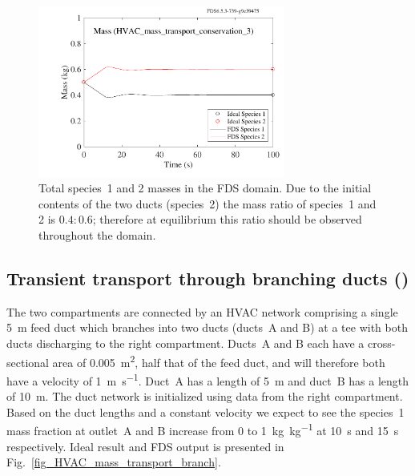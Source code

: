 \documentclass[11pt]{book}
\begin{document}
\begin{figure}[ht]
\centering
\includegraphics[width=3.2in]{SCRIPT_FIGURES/HVAC_mass_transport_conservation_3}
\caption[ test case.]{Total species~1 and 2 masses in the FDS domain. Due to the initial contents of the two ducts (species~2) the mass ratio of species~1 and 2 is \(0.4 \colon 0.6\); therefore at equilibrium this ratio should be observed throughout the domain.}
\label{fig_HVAC_mass_transport_conservation_3}
\end{figure}

\subsection{Transient transport through branching ducts (\texorpdfstring{}{HVAC\_mass\_transport\_branch})}
\label{HVAC_mass_transport_branch}
The two compartments are connected by an HVAC network comprising a single \SI{5}{\meter} feed duct which branches into two ducts (ducts~A and B) at a tee with both ducts discharging to the right compartment. Ducts~A and B each have a cross-sectional area of \SI{0.005}{\meter\squared}, half that of the feed duct, and will therefore both have a velocity of \SI[per-mode=symbol]{1}{\meter\per\second}. Duct~A has a length of \SI{5}{\meter} and duct~B has a length of \SI{10}{\meter}. The duct network is initialized using data from the right compartment. Based on the duct lengths and a constant velocity we expect to see the species~\num{1} mass fraction at outlet~A and B increase from \num{0} to \SI[per-mode=symbol]{1}{\kilogram\per\kilogram} at \SI{10}{\second} and \SI{15}{\second} respectively. Ideal result and FDS output is presented in Fig.~\ref{fig_HVAC_mass_transport_branch}.
\end{document}

